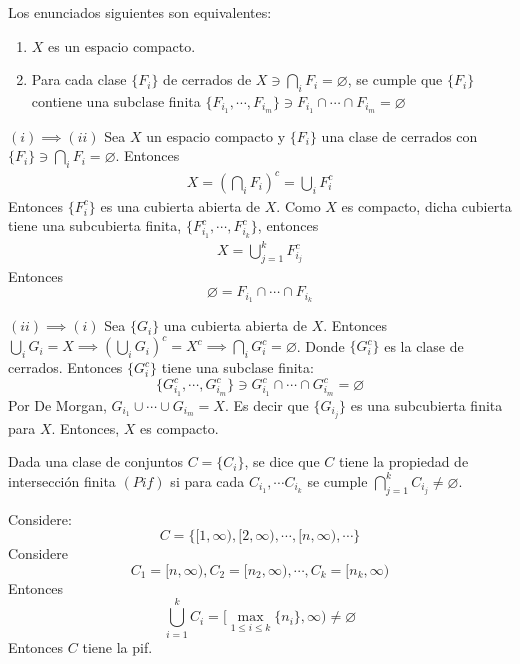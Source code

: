 \begin{teorema}
    Los enunciados siguientes son equivalentes: 
    \begin{enumerate}
        \item $X$ es un espacio compacto. 
        \item Para cada clase $\{F_i\}$ de cerrados de $X\ni \bigcap_{i}F_i=\varnothing$, se cumple que $\{F_i\}$ contiene una subclase finita $\{F_{i_1}, \cdots, F_{i_m}\}\ni F_{i_1}\cap \cdots \cap F_{i_m}=\varnothing$  
    \end{enumerate}
    \begin{dem}
        $(i)\implies (ii)$ Sea $X$ un espacio compacto y $\{F_i\}$ una clase de cerrados con $\{F_i\}\ni \bigcap_i F_i=\varnothing$. Entonces
        \begin{align*}
            X=\left(\bigcap_i F_i\right)^c = \bigcup_i F_i^c
        \end{align*}
        Entonces 
        $\{F_i^c\}$ es una cubierta abierta de $X$. Como $X$ es compacto, dicha cubierta tiene una subcubierta finita, $\{F_{i_1}^c,\cdots, F_{i_k}^c\}$, entonces 
        \begin{align*}
            X= \bigcup_{j=1}^k F_{i_j}^c 
        \end{align*}
        Entonces 
        $$\varnothing =F_{i_1}\cap \cdots \cap F_{i_k}$$

        $(ii)\implies (i)$ Sea $\{G_i\}$ una cubierta abierta de $X$. Entonces $\bigcup_i G_i = X\implies (\bigcup_i G_i)^c =X^c \implies \bigcap_i G_i^c=\varnothing$. Donde $\{G_i^c\}$ es la clase de cerrados. Entonces $\{G_i^c\}$ tiene una subclase finita: 
        $$\{G_{i_1}^c,\cdots, G_{i_m}^c\}\ni G_{i_1}^c\cap\cdots \cap G_{i_m}^c=\varnothing$$
        Por De Morgan, $G_{i_1}\cup \cdots \cup G_{i_m}=X$. Es decir que $\{G_{i_j}\}$ es una subcubierta finita para $X$. Entonces, $X$ es compacto. 
    \end{dem}
\end{teorema}

\begin{nota}
    Dada una clase de conjuntos $C=\{C_i\}$, se dice que $C$ tiene la propiedad de intersección finita $(Pif)$ si para cada $C_{i_1}, \cdots C_{i_k}$ se cumple $\bigcap_{j=1}^k C_{i_j}\neq \varnothing$.  
\end{nota}

\begin{ejemplo}
    Considere: 
    $$C=\{[1,\infty), [2,\infty), \cdots, [n, \infty),\cdots\}$$
    Considere $$C_1=[n,\infty),C_2=[n_2,\infty), \cdots, C_k=[n_k,\infty)$$
    Entonces 
    $$\bigcup_{i=1}^k C_i=[\max_{1\leq i\leq k}\{n_i\},\infty)\neq \varnothing$$ 
    Entonces $C$ tiene la pif. 
\end{ejemplo}

